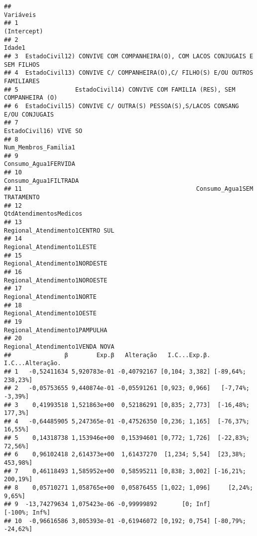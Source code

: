 \documentclass[
]{article}
\begin{document}
\begin{verbatim}
##                                                                      Variáveis
## 1                                                                  (Intercept)
## 2                                                                       Idade1
## 3  EstadoCivil12) CONVIVE COM COMPANHEIRA(O), COM LACOS CONJUGAIS E SEM FILHOS
## 4  EstadoCivil13) CONVIVE C/ COMPANHEIRA(O),C/ FILHO(S) E/OU OUTROS FAMILIARES
## 5                EstadoCivil14) CONVIVE COM FAMILIA (RES), SEM COMPANHEIRA (O)
## 6  EstadoCivil15) CONVIVE C/ OUTRA(S) PESSOA(S),S/LACOS CONSANG E/OU CONJUGAIS
## 7                                                       EstadoCivil16) VIVE SO
## 8                                                         Num_Membros_Familia1
## 9                                                         Consumo_Agua1FERVIDA
## 10                                                       Consumo_Agua1FILTRADA
## 11                                                 Consumo_Agua1SEM TRATAMENTO
## 12                                                      QtdAtendimentosMedicos
## 13                                             Regional_Atendimento1CENTRO SUL
## 14                                                  Regional_Atendimento1LESTE
## 15                                               Regional_Atendimento1NORDESTE
## 16                                               Regional_Atendimento1NOROESTE
## 17                                                  Regional_Atendimento1NORTE
## 18                                                  Regional_Atendimento1OESTE
## 19                                               Regional_Atendimento1PAMPULHA
## 20                                             Regional_Atendimento1VENDA NOVA
##               β        Exp.β   Alteração   I.C...Exp.β.   I.C...Alteração.
## 1   -0,52411634 5,920783e-01 -0,40792167 [0,104; 3,382] [-89,64%; 238,23%]
## 2   -0,05753655 9,440874e-01 -0,05591261 [0,923; 0,966]   [-7,74%; -3,39%]
## 3    0,41993518 1,521863e+00  0,52186291 [0,835; 2,773]  [-16,48%; 177,3%]
## 4   -0,64485905 5,247365e-01 -0,47526350 [0,236; 1,165]  [-76,37%; 16,55%]
## 5    0,14318738 1,153946e+00  0,15394601 [0,772; 1,726]  [-22,83%; 72,56%]
## 6    0,96102418 2,614373e+00  1,61437270  [1,234; 5,54]  [23,38%; 453,98%]
## 7    0,46118493 1,585952e+00  0,58595211 [0,838; 3,002] [-16,21%; 200,19%]
## 8    0,05710271 1,058765e+00  0,05876455 [1,022; 1,096]     [2,24%; 9,65%]
## 9  -13,74279634 1,075423e-06 -0,99999892       [0; Inf]      [-100%; Inf%]
## 10  -0,96616586 3,805393e-01 -0,61946072 [0,192; 0,754] [-80,79%; -24,62%]

\end{verbatim}
\end{document}
